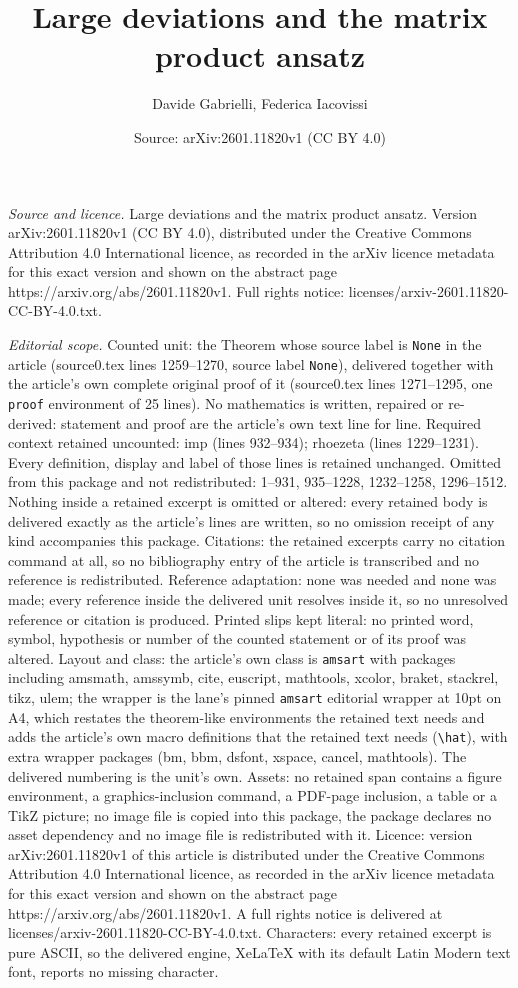 \documentclass[10pt,a4paper]{amsart}
\title[Large deviations and the matrix product ansatz]{Large deviations and the matrix product ansatz}
\author{Davide Gabrielli, Federica Iacovissi}
\date{Source: arXiv:2601.11820v1 (CC BY 4.0)}
\begin{document}
\maketitle

\noindent\emph{Source and licence.} Large deviations and the matrix product ansatz. Version arXiv:2601.11820v1 (CC BY 4.0), distributed under the Creative Commons Attribution 4.0 International licence, as recorded in the arXiv licence metadata for this exact version and shown on the abstract page https://arxiv.org/abs/2601.11820v1. Full rights notice: licenses/arxiv-2601.11820-CC-BY-4.0.txt.\par\smallskip

\noindent\textit{Editorial scope.} Counted unit: the Theorem whose source label is \texttt{None} in the article (source0.tex lines 1259--1270, source label \texttt{None}), delivered together with the article's own complete original proof of it (source0.tex lines 1271--1295, one \texttt{proof} environment of 25 lines). No mathematics is written, repaired or re-derived: statement and proof are the article's own text line for line. Required context retained uncounted: imp (lines 932--934); rhoezeta (lines 1229--1231). Every definition, display and label of those lines is retained unchanged. Omitted from this package and not redistributed: 1--931, 935--1228, 1232--1258, 1296--1512. Nothing inside a retained excerpt is omitted or altered: every retained body is delivered exactly as the article's lines are written, so no omission receipt of any kind accompanies this package. Citations: the retained excerpts carry no citation command at all, so no bibliography entry of the article is transcribed and no reference is redistributed. Reference adaptation: none was needed and none was made; every reference inside the delivered unit resolves inside it, so no unresolved reference or citation is produced. Printed slips kept literal: no printed word, symbol, hypothesis or number of the counted statement or of its proof was altered. Layout and class: the article's own class is \texttt{amsart} with packages including amsmath, amssymb, cite, euscript, mathtools, xcolor, braket, stackrel, tikz, ulem; the wrapper is the lane's pinned \texttt{amsart} editorial wrapper at 10pt on A4, which restates the theorem-like environments the retained text needs and adds the article's own macro definitions that the retained text needs (\texttt{\textbackslash hat}), with extra wrapper packages (bm, bbm, dsfont, xspace, cancel, mathtools). The delivered numbering is the unit's own. Assets: no retained span contains a figure environment, a graphics-inclusion command, a PDF-page inclusion, a table or a TikZ picture; no image file is copied into this package, the package declares no asset dependency and no image file is redistributed with it. Licence: version arXiv:2601.11820v1 of this article is distributed under the Creative Commons Attribution 4.0 International licence, as recorded in the arXiv licence metadata for this exact version and shown on the abstract page https://arxiv.org/abs/2601.11820v1. A full rights notice is delivered at licenses/arxiv-2601.11820-CC-BY-4.0.txt. Characters: every retained excerpt is pure ASCII, so the delivered engine, XeLaTeX with its default Latin Modern text font, reports no missing character.
\end{document}
